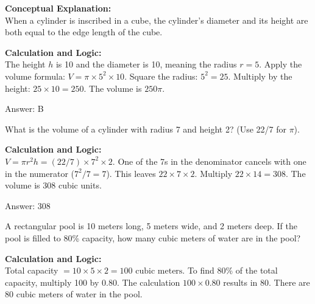 \documentclass[11pt,paper=a4,answers]{exam}
\begin{document}
\begin{questions}
\begin{solution}
\textbf{Conceptual Explanation:} \\
When a cylinder is inscribed in a cube, the cylinder's diameter and its height are both equal to the edge length of the cube.

\vspace{30pt}

\textbf{Calculation and Logic:} \\
The height $h$ is 10 and the diameter is 10, meaning the radius $r = 5$. Apply the volume formula: $V = \pi \times 5^2 \times 10$. Square the radius: $5^2 = 25$. Multiply by the height: $25 \times 10 = 250$. The volume is $250\pi$.

\vspace{30pt}

Answer: \colorbox{yellow!100}{B}
\end{solution}

\vspace{60pt}

\question
What is the volume of a cylinder with radius 7 and height 2? (Use 22/7 for $\pi$).

\begin{solution}
\textbf{Calculation and Logic:} \\
$V = \pi r^2 h = (22/7) \times 7^2 \times 2$. One of the 7s in the denominator cancels with one in the numerator ($7^2 / 7 = 7$). This leaves $22 \times 7 \times 2$. Multiply $22 \times 14 = 308$. The volume is 308 cubic units.

\vspace{30pt}

Answer: \colorbox{yellow!100}{308}
\end{solution}

\vspace{60pt}

\question
A rectangular pool is 10 meters long, 5 meters wide, and 2 meters deep. If the pool is filled to 80\% capacity, how many cubic meters of water are in the pool?

\begin{solution}
\textbf{Calculation and Logic:} \\
Total capacity $= 10 \times 5 \times 2 = 100 \text{ cubic meters}$. To find 80\% of the total capacity, multiply 100 by 0.80. The calculation $100 \times 0.80$ results in 80. There are 80 cubic meters of water in the pool.


\end{solution}
\end{questions}
\end{document}

